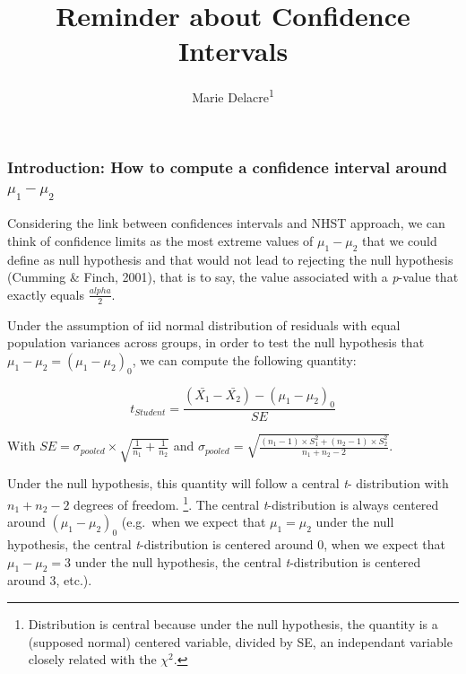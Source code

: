 \documentclass[
  man,floatsintext]{apa6}
\affiliation{
\vspace{0.5cm}
\textsuperscript{1} ULB}
\title{Reminder about Confidence Intervals}
\author{Marie Delacre\textsuperscript{1}}
\date{}
\begin{document}
\maketitle

\hypertarget{introduction-how-to-compute-a-confidence-interval-around-mu_1-mu_2}{%
\subsubsection{\texorpdfstring{Introduction: How to compute a confidence interval around \(\mu_1-\mu_2\)}{Introduction: How to compute a confidence interval around \textbackslash mu\_1-\textbackslash mu\_2}}\label{introduction-how-to-compute-a-confidence-interval-around-mu_1-mu_2}}

Considering the link between confidences intervals and NHST approach, we can think of confidence limits as the most extreme values of \(\mu_1-\mu_2\) that we could define as null hypothesis and that would not lead to rejecting the null hypothesis (Cumming \& Finch, 2001), that is to say, the value associated with a \emph{p}-value that exactly equals \(\frac{alpha}{2}\).

Under the assumption of iid normal distribution of residuals with equal population variances across groups, in order to test the null hypothesis that \(\mu_1-\mu_2= (\mu_1-\mu_2)_0\), we can compute the following quantity:

\begin{equation} 
t_{Student}=\frac{(\bar{X_1}-\bar{X_2})-(\mu_1-\mu_2)_0}{SE}
\label{eq:tstudent}
\end{equation}

With \(SE = \sigma_{pooled} \times \sqrt{\frac{1}{n_1}+\frac{1}{n_2}}\) and \(\sigma_{pooled} = \sqrt{\frac{(n_1-1) \times S^2_1+(n_2-1)\times S^2_2}{n_1+n_2-2}}\).

Under the null hypothesis, this quantity will follow a central \emph{t}- distribution with \(n_1+n_2-2\) degrees of freedom. \footnote{Distribution is central because under the null hypothesis, the quantity is a (supposed normal) centered variable, divided by SE, an independant variable closely related with the $\chi^2$. }. The central \emph{t}-distribution is always centered around \((\mu_1-\mu_2)_0\) (e.g.~when we expect that \(\mu_1=\mu_2\) under the null hypothesis, the central \emph{t}-distribution is centered around 0, when we expect that \(\mu_1-\mu_2=3\) under the null hypothesis, the central \emph{t}-distribution is centered around 3, etc.).
\end{document}
